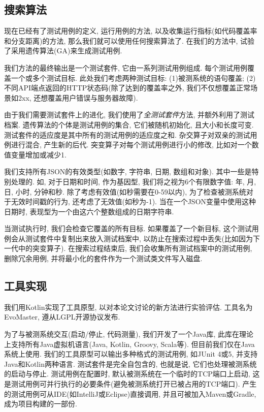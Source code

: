     \subsection{搜索算法}
    现在已经有了测试用例的定义, 运行用例的方法, 以及收集运行指标(如代码覆盖率和分支距离)的方法, 那么我们就可以使用任何搜索算法了. 在我们的方法中, 试验了采用遗传算法(GA)来生成测试用例.
    
    我们方法的最终输出是一个测试套件, 它由一系列测试用例组成. 每个测试用例覆盖一个或多个测试目标. 此处我们考虑两种测试目标: (1)被测系统的语句覆盖; (2)不同API端点返回的HTTP状态码(除了达到的覆盖率之外, 我们不仅想覆盖正常场景如2xx, 还想覆盖用户错误与服务器故障). 
    
    由于我们需要测试套件上的进化, 我们使用了\textit{全测试套件}方法\cite{fraser2013whole}, 并额外利用了测试档案\cite{rojas2017detailed}. 遗传算法的个体是测试用例的集合, 它们被随机初始化, 且大小和长度可变. 测试套件的适应度是其中所有的测试用例的适应度之和. 杂交算子对双亲的测试用例进行混合, 产生新的后代. 突变算子对每个测试用例进行小的修改, 比如对一个数值变量增加或减少1.
    
    我们支持所有JSON的有效类型(如数字, 字符串, 日期, 数组和对象). 其中一些是特别处理的. 如, 对于日期和时间, 作为基因型, 我们将之视为6个有限数字值: 年, 月, 日, 小时, 分钟和秒. 除了考虑有效值(如秒需要在0-59以内), 为了检查被测系统对于无效时间戳的行为, 还考虑了无效值(如秒为-1). 当在一个JSON变量中使用这种日期时, 表现型为一个由这六个整数组成的日期字符串.
    
    当测试执行时, 我们会检查它覆盖的所有目标. 如果覆盖了一个新目标, 这个测试用例会从测试套件中复制出来放入测试档案中, 以防止在搜索过程中丢失(比如因为下一代中的突变算子). 在搜索过程结束后, 我们会收集所有测试档案中的测试用例, 删除冗余用例, 并将最小化的套件作为一个测试类文件写入磁盘.
    
    \subsection{工具实现}
    我们用Kotlin实现了工具原型, 以对本论文讨论的新方法进行实验评估. 工具名为EvoMaster, 遵从LGPL开源协议发布. 
    
    为了与被测系统交互(启动/停止, 代码测量), 我们开发了一个Java库, 此库在理论上支持所有Java虚拟机语言(Java, Kotlin, Groovy, Scala等). 但目前我们仅在Java系统上使用. 我们的工具原型可以输出多种格式的测试用例, 如JUnit 4或5, 并支持Java和Kotlin两种语言. 测试套件是完全自包含的, 也就是说, 它们也处理被测系统的启动与停止. 测试用例在配置时, 默认被测系统在一个临时的TCP端口上启动, 这是测试用例可并行执行的必要条件(避免被测系统打开已被占用的TCP端口). 产生的测试用例可从IDE(如IntelliJ或Eclipse)直接调用, 并且可被加入Maven或Gradle, 成为项目构建的一部份. 
    
